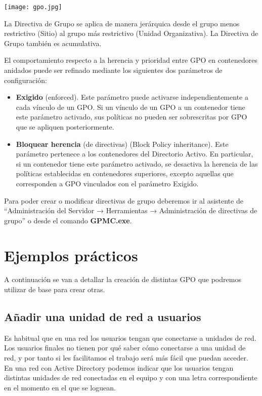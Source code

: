 \begin{center}
    \vspace{-15pt}
    \texttt{[image: gpo.jpg]}
    \vspace{-25pt}
\end{center}

La Directiva de Grupo se aplica de manera jerárquica desde el grupo menos restrictivo (Sitio) al grupo más restrictivo (Unidad Organizativa). La Directiva de Grupo también es acumulativa.

El comportamiento respecto a la herencia y prioridad entre GPO en contenedores anidados puede ser refinado mediante los siguientes dos parámetros de configuración:

\begin{itemize}
    \item \textbf{Exigido} (enforced). Este parámetro puede activarse independientemente a cada vínculo de un GPO. Si un vínculo de un GPO a un contenedor tiene este parámetro activado, sus políticas no pueden ser sobrescritas por GPO que se apliquen posteriormente.

    \item \textbf{Bloquear herencia} (de directivas) (Block Policy inheritance). Este parámetro pertenece a los contenedores del Directorio Activo. En particular, si un contenedor tiene este parámetro activado, se desactiva la herencia de las políticas establecidas en contenedores superiores, excepto aquellas que corresponden a GPO vinculados con el parámetro Exigido.
\end{itemize}

Para poder crear o modificar directivas de grupo deberemos ir al asistente de “Administración del Servidor → Herramientas →  Administración de directivas de grupo” o desde el comando \textbf{GPMC.exe}.


\section{Ejemplos prácticos}
A continuación se van a detallar la creación de distintas GPO que podremos utilizar de base para crear otras.

\subsection{Añadir una unidad de red a usuarios}
Es habitual que en una red los usuarios tengan que conectarse a unidades de red. Los usuarios finales no tienen por qué saber cómo conectarse a una unidad de red, y por tanto si les facilitamos el trabajo será más fácil que puedan acceder. En una red con Active Directory podemos indicar que los usuarios tengan distintas unidades de red conectadas en el equipo y con una letra correspondiente en el momento en el que se loguean.


